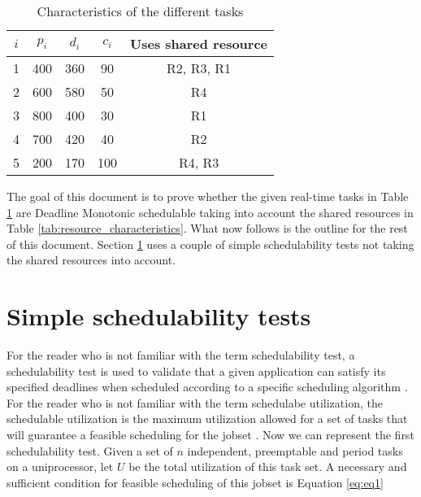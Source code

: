 \documentclass[10pt]{article}
\begin{document}
\begin{table}[H]
    \centering
    \begin{tabular}{|c|c|c|c|c|}
        \hline 
        \textcolor{darkpink}{$i$} & \textcolor{darkpink}{\textit{$p_i$}} & \textcolor{darkpink}{\textit{$d_i$}} & \textcolor{darkpink}{\textit{$c_i$}} & \textcolor{darkpink}{Uses shared resource} \\
        \hline

        1 & 400 & 360 & 90 & R2, R3, R1 \\
        \hline

        2 & 600 & 580 & 50 & R4 \\
        \hline

        3 & 800 & 400 & 30 & R1 \\
        \hline

        4 & 700 & 420 & 40 & R2 \\
        \hline

        5 & 200 & 170 & 100 & R4, R3 \\
        \hline

    \end{tabular}
    
    \caption{Characteristics of the different tasks}
    \label{tab:task_characteristics}
\end{table}

The goal of this document is to prove whether the given real-time tasks in Table \ref{tab:task_characteristics} are Deadline Monotonic schedulable taking into account the shared resources in Table \ref{tab:resource_characteristics}.
What now follows is the outline for the rest of this document.
Section \ref{sec:simple_test} uses a couple of simple schedulability tests not taking the shared resources into account.

\newpage
\section{Simple schedulability tests}
\label{sec:simple_test}

For the reader who is not familiar with the term schedulability test, a schedulability test is used to validate that a given application can satisfy its specified deadlines when scheduled according to a specific scheduling algorithm \cite{cheng}.
For the reader who is not familiar with the term schedulabe utilization, the schedulable utilization is the maximum utilization allowed for a set of tasks that will guarantee a feasible scheduling for the jobset \cite{cheng} \cite{ucosii}.
Now we can represent the first schedulability test.
Given a set of $n$ independent, preemptable and period tasks on a uniprocessor, let $U$ be the total utilization of this task set.
A necessary and sufficient condition for feasible scheduling of this jobset is Equation \ref{eq:eq1}
\end{document}

